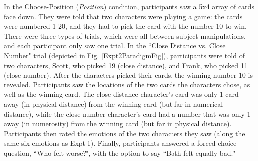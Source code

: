 \documentclass[10pt,letterpaper]{article}
\newcommand{\red}[1]{\textcolor{Red}{#1}}
\begin{document}



\begin{table}
{}
\caption{Predictions for near miss effects in Experiment 2. Near-miss effects are predicted to be strongest when the agent is close on a dimension over which they have illusory control.}
\label{Expt2Predictions}
\end{table}


	In the Choose-Position (\textit{Position}) condition, participants saw a 5x4 array of cards face down. They were told that two characters were playing a game: the cards were numbered 1-20, and they had to pick the card with the number 10 to win. There were three types of trials, which were all between subject manipulations, and each participant only saw one trial. In the ``Close Distance vs. Close Number" trial (depicted in Fig. \ref{Expt2ParadigmFig}), participants were told of two characters, Scott, who picked 19 (close distance), and Frank, who picked 11 (close number). After the characters picked their cards, the winning number 10 is revealed. Participants saw the locations of the two cards the characters chose, as well as the winning card. The close distance character's card was only 1 card away (in physical distance) from the winning card (but far in numerical distance), while the close number character's card had a number that was only 1 away (in numerosity) from the winning card (but far in physical distance). Participants then rated the emotions of the two characters they saw (along the same six emotions as Expt 1). Finally, participants answered a forced-choice question, ``Who felt worse?", with the option to say ``Both felt equally bad."
\end{document}
